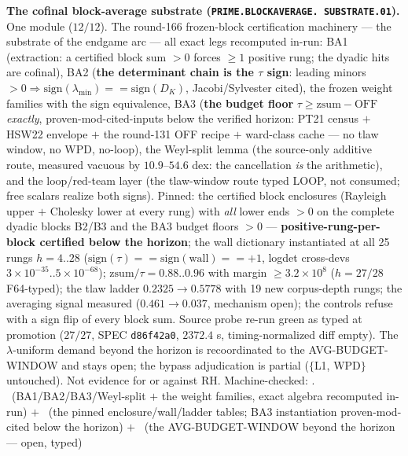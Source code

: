 \par\smallskip\noindent\textbf{The cofinal block-average
substrate (\texttt{PRIME.\allowbreak BLOCKAVERAGE.\allowbreak
SUBSTRATE.01}).}
One module ($12/12$).  The round-166 frozen-block certification
machinery --- the substrate of the endgame arc --- all exact
legs recomputed in-run: BA1 (extraction: a certified block sum
$> 0$ forces $\ge 1$ positive rung; the dyadic hits are
cofinal), BA2 (\textbf{the determinant chain is the $\tau$
sign}: leading minors $> 0 \Rightarrow \mathrm{sign}(\lambda_{\min})
== \mathrm{sign}(D_K)$, Jacobi/Sylvester cited), the frozen
weight families with the sign equivalence, BA3 (\textbf{the
budget floor} $\tau \ge \mathrm{zsum} - \mathrm{OFF}$
\emph{exactly}, proven-mod-cited-inputs below the verified
horizon: PT21 census $+$ HSW22 envelope $+$ the round-131 OFF
recipe $+$ ward-class cache --- no tlaw window, no WPD,
no-loop), the Weyl-split lemma (the source-only additive route,
measured vacuous by $10.9$--$54.6$ dex: the cancellation
\emph{is} the arithmetic), and the loop/red-team layer (the
tlaw-window route typed LOOP, not consumed; free scalars realize
both signs).  Pinned: the certified block enclosures (Rayleigh
upper $+$ Cholesky lower at every rung) with \emph{all} lower
ends $> 0$ on the complete dyadic blocks B2/B3 and the BA3
budget floors $> 0$ --- \textbf{positive-rung-per-block
certified below the horizon}; the wall dictionary instantiated
at all 25 rungs $h = 4..28$ ($\mathrm{sign}(\tau) ==
\mathrm{sign}(\mathrm{wall}) == +1$, logdet cross-devs
$3\times10^{-35}..5\times10^{-68}$); $\mathrm{zsum}/\tau =
0.88..0.96$ with margin $\ge 3.2\times10^8$ ($h = 27/28$
F64-typed); the tlaw ladder $0.2325 \to 0.5778$ with 19 new
corpus-depth rungs; the averaging signal measured ($0.461 \to
0.037$, mechanism open); the controls refuse with a sign flip
of every block sum.  Source probe re-run green as typed at
promotion ($27/27$, SPEC \texttt{d86f42a0}, $2372.4$ s,
timing-normalized diff empty).  The $\lambda$-uniform demand
beyond the horizon is recoordinated to the AVG-BUDGET-WINDOW
and stays open; the bypass adjudication is partial ($\{$L1,
WPD$\}$ untouched).  Not evidence for or against RH.
Machine-checked:
.
\mE\ (BA1/BA2/BA3/Weyl-split $+$ the weight families, exact
algebra recomputed in-run) $+$ \mC\ (the pinned
enclosure/wall/ladder tables; BA3 instantiation
proven-mod-cited below the horizon) $+$ \mO\ (the
AVG-BUDGET-WINDOW beyond the horizon --- open, typed)
\par\smallskip



